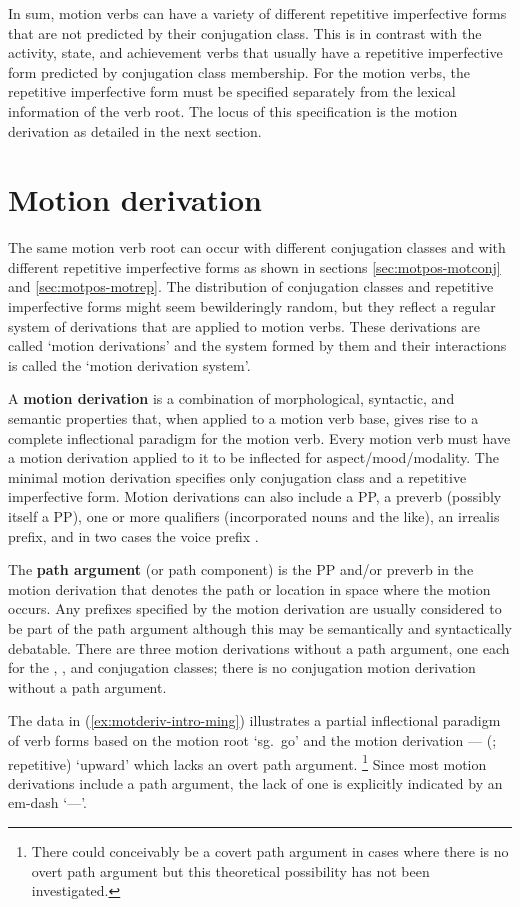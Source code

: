 \documentclass[12pt,letterpaper,oneside,article]{memoir}
\begin{document}
In sum, motion verbs can have a variety of different repetitive imperfective forms that are not predicted by their conjugation class.
This is in contrast with the activity, state, and achievement verbs that usually have a repetitive imperfective form predicted by conjugation class membership.
For the motion verbs, the repetitive imperfective form must be specified separately from the lexical information of the verb root.
The locus of this specification is the motion derivation as detailed in the next section.

\section{Motion derivation}\label{sec:motderiv}

The same motion verb root can occur with different conjugation classes and with different repetitive imperfective forms as shown in sections \ref{sec:motpos-motconj} and \ref{sec:motpos-motrep}.
The distribution of conjugation classes and repetitive imperfective forms might seem bewilderingly random, but they reflect a regular system of derivations that are applied to motion verbs.
These derivations are called ‘motion derivations’ and the system formed by them and their interactions is called the ‘motion derivation system’.

A \textbf{motion derivation} is a combination of morphological, syntactic, and semantic properties that, when applied to a motion verb base, gives rise to a complete inflectional paradigm for the motion verb.
Every motion verb must have a motion derivation applied to it to be inflected for aspect/mood/modality.
The minimal motion derivation specifies only conjugation class and a repetitive imperfective form.
Motion derivations can also include a PP, a preverb (possibly itself a PP), one or more qualifiers (incorporated nouns and the like), an irrealis prefix, and in two cases the voice prefix .

The \textbf{path argument} (or path component) is the PP and/or preverb in the motion derivation that denotes the path or location in space where the motion occurs.
Any prefixes specified by the motion derivation are usually considered to be part of the path argument although this may be semantically and syntactically debatable.
There are three motion derivations without a path argument, one each for the , , and  conjugation classes; there is no  conjugation motion derivation without a path argument.

The data in (\ref{ex:motderiv-intro-ming}) illustrates a partial inflectional paradigm of verb forms based on the motion root  ‘sg.\ go’ and the motion derivation {} — (;  repetitive) ‘upward’ which lacks an overt path argument.%
\footnote{There could conceivably be a covert path argument in cases where there is no overt path argument but this theoretical possibility has not been investigated.}
Since most motion derivations include a path argument, the lack of one is explicitly indicated by an em-dash ‘—’.
\end{document}
